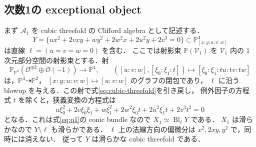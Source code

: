 \subsection{次数1の exceptional object}

まず $\mathcal A_1$ を cubic threefold の Clifford algebra として記述する．
\begin{equation}
 Y=\{ux^2+2vxy+wy^2+2w^2x+2u^2y+2v^3=0\}
 \subset\mathbb P^4_{[x:y:u:v:w]}
 \label{eq:cubic-threefold}
\end{equation}
は直線 $\ell=(u=v=w=0)$ を含む．
ここでは射影束 $\mathbb P(\mathcal V_1)$ を $\mathcal V_1$ 内の
1次元部分空間の射影束とする．射
\[
 \mathbb P_{\mathbb P^2}(\mathcal O^{\oplus2}\oplus\mathcal O(-1))
 \longrightarrow\mathbb P^4,
 \qquad ([u:v:w],[\xi_0:\xi_1:t])
 \longmapsto[\xi_0:\xi_1:tu:tv:tw]
\]
は，$\mathbb P^4\dashrightarrow\mathbb P^2$，
$[x:y:u:v:w]\mapsto[u:v:w]$ のグラフの閉包であり，
$\ell$ に沿う blowup を与える．この射で式\eqref{eq:cubic-threefold}を引き戻し，
例外因子の方程式 $t$ を除くと，狭義変換の方程式は
\[
 u\xi_0^2+2v\xi_0\xi_1+w\xi_1^2
 +2w^2\xi_0t+2u^2\xi_1t+2v^3t^2=0
\]
となる．これは式\eqref{eq:q1}の conic bundle なので
$X_1\simeq\operatorname{Bl}_{\ell}Y$ である．
$X_1$ は滑らかなので $Y\setminus\ell$ も滑らかである．
$\ell$ 上の法線方向の偏微分は $x^2,2xy,y^2$ で，同時には消えない．
従って $Y$ は滑らかな cubic threefold である．

